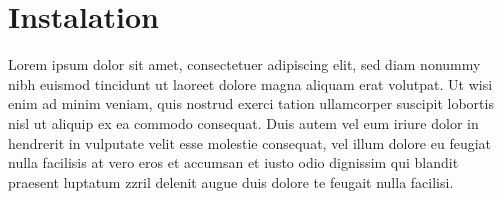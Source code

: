 {
	\section{Instalation}
}
Lorem ipsum dolor sit amet, consectetuer adipiscing elit, sed diam nonummy nibh euismod tincidunt ut laoreet dolore magna aliquam erat volutpat. Ut wisi enim ad minim veniam, quis nostrud exerci tation ullamcorper suscipit lobortis nisl ut aliquip ex ea commodo consequat. Duis autem vel eum iriure dolor in hendrerit in vulputate velit esse molestie consequat, vel illum dolore eu feugiat nulla facilisis at vero eros et accumsan et iusto odio dignissim qui blandit praesent luptatum zzril delenit augue duis dolore te feugait nulla facilisi. 
